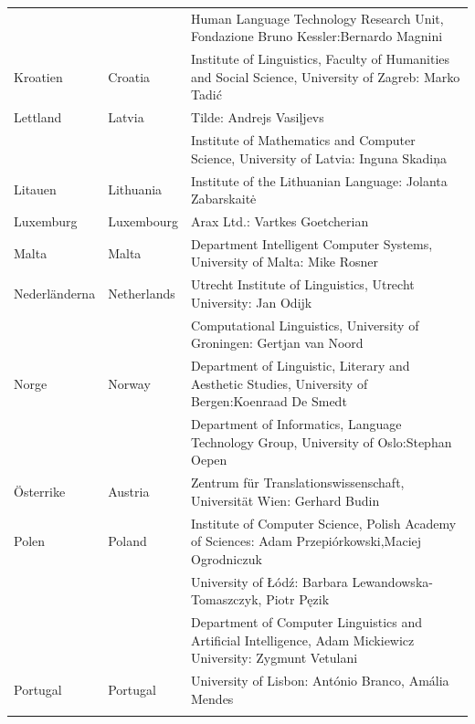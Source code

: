 \begin{longtable}{llp{114mm}}
  & & Human Language Technology Research Unit, Fondazione Bruno Kessler:\newline Bernardo Magnini\\ \addlinespace 
  Kroatien & \textcolor{grey1}{Croatia} & Institute of Linguistics, Faculty of Humanities and Social Science, University of Zagreb: Marko Tadić \\ \addlinespace
  Lettland & \textcolor{grey1}{Latvia} & Tilde: Andrejs Vasiļjevs\\ \addlinespace 
  & & Institute of Mathematics and Computer Science, University of Latvia: Inguna Skadiņa\\ \addlinespace
  Litauen & \textcolor{grey1}{Lithuania} & Institute of the Lithuanian Language: Jolanta Zabarskaitė\\ \addlinespace
  Luxemburg & \textcolor{grey1}{Luxembourg} & Arax Ltd.: Vartkes Goetcherian\\ \addlinespace
  Malta & \textcolor{grey1}{Malta} & Department Intelligent Computer Systems, University of Malta: Mike Rosner\\ \addlinespace
  Nederländerna & \textcolor{grey1}{Netherlands} & Utrecht Institute of Linguistics, Utrecht University: Jan Odijk\\ \addlinespace 
  & & Computational Linguistics, University of Groningen: Gertjan van Noord\\ \addlinespace
  Norge & \textcolor{grey1}{Norway} & Department of Linguistic,
  Literary and Aesthetic Studies, University of Bergen:\newline Koenraad De Smedt\\ \addlinespace 
  & & Department of Informatics, Language Technology Group, University of Oslo:\newline Stephan Oepen \\ \addlinespace
  Österrike  & \textcolor{grey1}{Austria} & Zentrum für Translationswissenschaft, Universität Wien: Gerhard Budin\\ \addlinespace 
  Polen & \textcolor{grey1}{Poland} & Institute of Computer Science, Polish Academy of Sciences: Adam Przepiórkowski,\newline Maciej Ogrodniczuk \\ \addlinespace
  & & University of Łódź: Barbara Lewandowska-Tomaszczyk, Piotr Pęzik\\ \addlinespace
  & & Department of Computer Linguistics and Artificial Intelligence, Adam Mickiewicz University: Zygmunt Vetulani \\ \addlinespace
  Portugal & \textcolor{grey1}{Portugal} & University of Lisbon: António Branco, Amália Mendes \\ \addlinespace

\end{longtable}
